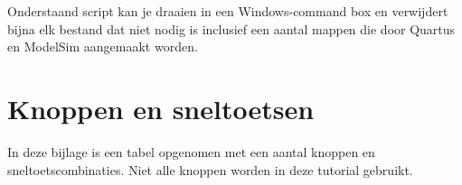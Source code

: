 \documentclass[a4paper,12pt,fleqn,twoside]{book}
\begin{document}
Onderstaand script kan je draaien in een Windows-command box en verwijdert
bijna elk bestand dat niet nodig is inclusief een aantal mappen die door
Quartus en ModelSim aangemaakt worden.




\appendix

\chapter{Knoppen en sneltoetsen}
\label{chap:knoppenensneltoetscombinatie}
In deze bijlage is een tabel opgenomen met een aantal knoppen en sneltoetscombinaties. Niet alle 
knoppen worden in deze tutorial gebruikt.

\end{document}
